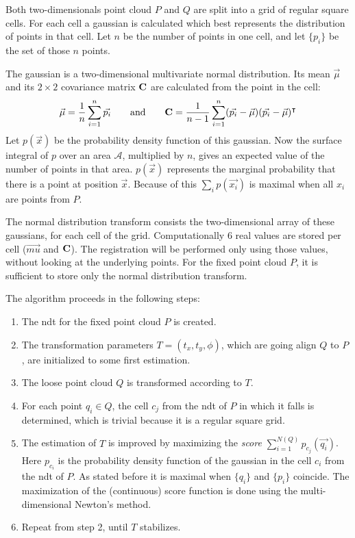 Both two-dimensionals point cloud $P$ and $Q$ are split into a grid of regular square cells. For each cell a gaussian is calculated which best represents the distribution of points in that cell. Let $n$ be the number of points in one cell, and let $\{ p_i \}$ be the set of those $n$ points.

The gaussian is a two-dimensional multivariate normal distribution. Its mean $\vec{\mu}$ and its $2 \times 2$ covariance matrix $\mathbf{C}$ are calculated from the point in the cell:
\begin{equation}
\vec{\mu} = \frac{1}{n} \sum_{i=1}^{n} \vec{p_i}
\hspace{7mm} \text{and} \hspace{7mm}
\mathbf{C} = \frac{1}{n - 1} \sum_{i=1}^{n} (\vec{p_i} - \vec{\mu}) (\vec{p_i} - \vec{\mu})^\intercal
\end{equation}
Let $p(\vec{x})$ be the probability density function of this gaussian. Now the surface integral of $p$ over an area $\mathcal{A}$, multiplied by $n$, gives an expected value of the number of points in that area. $p(\vec{x})$ represents the marginal probability that there is a point at position $\vec{x}$. Because of this $\sum_i p(\vec{x_i})$ is maximal when all $x_i$ are points from $P$.

The normal distribution transform consists the two-dimensional array of these gaussians, for each cell of the grid. Computationally $6$ real values are stored per cell ($\vec{mu}$ and $\mathbf{C}$). The registration will be performed only using those values, without looking at the underlying points. For the fixed point cloud $P$, it is sufficient to store only the normal distribution transform.

The algorithm proceeds in the following steps:
\begin{enumerate}
\item The \gls{ndt} for the fixed point cloud $P$ is created.
\item The transformation parameters $T = (t_x, t_y, \phi)$, which are going align $Q$ to $P$, are initialized to some first estimation.
\item The loose point cloud $Q$ is transformed according to $T$.
\item For each point $q_i \in Q$, the cell $c_j$ from the \gls{ndt} of $P$ in which it falls is determined, which is trivial because it is a regular square grid.
\item The estimation of $T$ is improved by maximizing the \emph{score} $\sum_{i=1}^{N(Q)} p_{c_j}(\vec{q_i})$. Here $p_{c_i}$ is the probability density function of the gaussian in the cell $c_i$ from the \gls{ndt} of $P$. As stated before it is maximal when $\{ q_i \}$ and $\{ p_i \}$ coincide. The maximization of the (continuous) score function is done using the multi-dimensional Newton's method.
\item Repeat from step 2, until $T$ stabilizes.
\end{enumerate}

